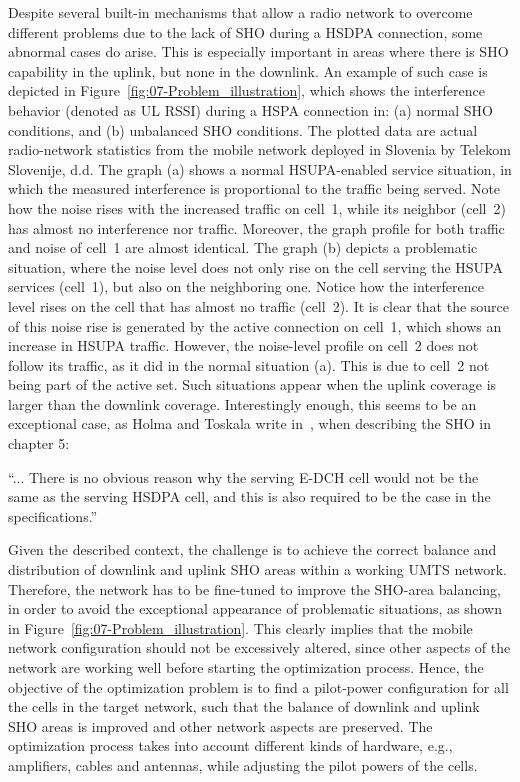 Despite several built-in mechanisms that allow a radio network to
overcome different problems due to the lack of SHO during a HSDPA
connection, some abnormal cases do arise. This is especially important
in areas where there is SHO capability in the uplink, but none in
the downlink. An example of such case is depicted in Figure~\ref{fig:07-Problem_illustration},
which shows the interference behavior (denoted as UL RSSI) during
a HSPA connection in: (a) normal SHO conditions, and (b) unbalanced
SHO conditions. The plotted data are actual radio-network statistics
from the mobile network deployed in Slovenia by Telekom Slovenije,
d.d. The graph (a) shows a normal HSUPA-enabled service situation,
in which the measured interference is proportional to the traffic
being served. Note how the noise rises with the increased traffic
on cell~1, while its neighbor (cell~2) has almost no interference
nor traffic. Moreover, the graph profile for both traffic and noise
of cell~1 are almost identical. The graph (b) depicts a problematic
situation, where the noise level does not only rise on the cell serving
the HSUPA services (cell~1), but also on the neighboring one. Notice
how the interference level rises on the cell that has almost no traffic
(cell~2). It is clear that the source of this noise rise is generated
by the active connection on cell~1, which shows an increase in HSUPA
traffic. However, the noise-level profile on cell~2 does not follow
its traffic, as it did in the normal situation (a). This is due to
cell~2 not being part of the active set. Such situations appear when
the uplink coverage is larger than the downlink coverage. Interestingly
enough, this seems to be an exceptional case, as Holma and Toskala
write in~\cite{holma2006hsdpa}, when describing the SHO in chapter
5:

\noindent ``... There is no obvious reason why the serving E-DCH cell
would not be the same as the serving HSDPA cell, and this is also
required to be the case in the specifications.''

Given the described context, the challenge is to achieve the correct
balance and distribution of downlink and uplink SHO areas within a
working UMTS network. Therefore, the network has to be fine-tuned
to improve the SHO-area balancing, in order to avoid the exceptional
appearance of problematic situations, as shown in Figure~\ref{fig:07-Problem_illustration}.
This clearly implies that the mobile network configuration should
not be excessively altered, since other aspects of the network are
working well before starting the optimization process. Hence, the
objective of the optimization problem is to find a pilot-power configuration
for all the cells in the target network, such that the balance of
downlink and uplink SHO areas is improved and other network aspects
are preserved. The optimization process takes into account different
kinds of hardware, e.g., amplifiers, cables and antennas, while adjusting
the pilot powers of the cells.

